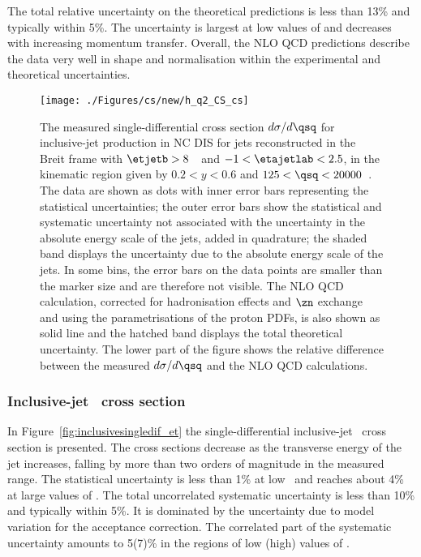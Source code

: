 The total relative uncertainty on the theoretical predictions is less than 13\% and typically within 5\%. The uncertainty is largest at low values of \qsq and decreases with increasing momentum transfer. Overall, the NLO QCD predictions describe the data very well in shape and normalisation within the experimental and theoretical uncertainties.
\begin{figure}[p]
	\centering
		\texttt{[image: ./Figures/cs/new/h\_q2\_CS\_cs]}
	\caption{The measured single-differential cross section $d\sigma/d\qsq$ for inclusive-jet production in NC DIS for jets reconstructed in the Breit frame with $\etjetb > 8$~\GeV~and $-1<\etajetlab<2.5$, in the kinematic region given by $0.2<y<0.6$ and $125 < \qsq < 20000$~\GeV. The data are shown as dots with inner error bars representing the statistical uncertainties; the outer error bars show the statistical and systematic uncertainty not associated with the uncertainty in the absolute energy scale of the jets, added in quadrature; the shaded band displays the uncertainty due to the absolute energy scale of the jets. In some bins, the error bars on the data points are smaller than the marker size and are therefore not visible. The NLO QCD calculation, corrected for hadronisation effects and $\zn$ exchange and using the  parametrisations of the proton PDFs, is also shown as solid line and the hatched band displays the total theoretical uncertainty. The lower part of the figure shows the relative difference between the measured $d\sigma/d\qsq$ and the NLO QCD calculations.} 
	\label{fig:inclusivesingledif_q2}
\end{figure}

\subsubsection*{Inclusive-jet \dsdetjetb~cross section}
In Figure~\ref{fig:inclusivesingledif_et} the single-differential inclusive-jet \dsdetjetb~cross section is presented. The cross sections decrease as the transverse energy of the jet increases, falling by more than two orders of magnitude in the measured range. The statistical uncertainty is less than 1\% at low \etjetb~and reaches about 4\% at large values of \etjetb. The total uncorrelated systematic uncertainty is less than 10\% and typically within 5\%. It is dominated by the uncertainty due to model variation for the acceptance correction. The correlated part of the systematic uncertainty amounts to 5(7)\%  in the regions of low (high) values of \etjetb.

